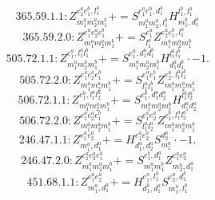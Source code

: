 \documentclass[letterpaper,10pt,fleqn,leqno,onecolumn]{article}
\begin{document}
\begin{equation} \;\;\;\;\;\;  365.59.1.1: Z^{e_{1}^{a}e_{1}^{b},l_{1}^{a}}_{m_{1}^{a}m_{2}^{a}m_{1}^{b}}+=S^{e_{1}^{a}e_{1}^{b},d_{1}^{a}}_{m_{1}^{a}m_{2}^{a},l_{1}^{b}}H^{l_{1}^{b},l_{1}^{a}}_{m_{1}^{b},d_{1}^{a}} \end{equation}
\begin{equation} \;\;\;\;\;\;  365.59.2.0: Z^{e_{1}^{a}e_{2}^{a}e_{1}^{b}}_{m_{1}^{a}m_{2}^{a}m_{1}^{b}}+=S^{e_{1}^{a}}_{l_{1}^{a}}Z^{e_{2}^{a}e_{1}^{b},l_{1}^{a}}_{m_{1}^{a}m_{2}^{a}m_{1}^{b}} \end{equation}
\begin{equation} \;\;\;\;\;\;  505.72.1.1: Z^{e_{1}^{a},l_{1}^{a}l_{1}^{b}}_{m_{1}^{a}m_{2}^{a}m_{1}^{b}}+=S^{e_{1}^{a},d_{1}^{a}d_{1}^{b}}_{m_{1}^{a}m_{2}^{a}m_{1}^{b}}H^{l_{1}^{a}l_{1}^{b}}_{d_{1}^{a}d_{1}^{b}}\cdot -1. \end{equation}
\begin{equation} \;\;\;\;\;\;  505.72.2.0: Z^{e_{1}^{a}e_{2}^{a}e_{1}^{b}}_{m_{1}^{a}m_{2}^{a}m_{1}^{b}}+=S^{e_{1}^{a}e_{1}^{b}}_{l_{1}^{a}l_{1}^{b}}Z^{e_{2}^{a},l_{1}^{a}l_{1}^{b}}_{m_{1}^{a}m_{2}^{a}m_{1}^{b}} \end{equation}
\begin{equation} \;\;\;\;\;\;  506.72.1.1: Z^{e_{1}^{b},l_{1}^{a}l_{2}^{a}}_{m_{1}^{a}m_{2}^{a}m_{1}^{b}}+=S^{e_{1}^{b},d_{1}^{a}d_{2}^{a}}_{m_{1}^{a}m_{2}^{a}m_{1}^{b}}H^{l_{1}^{a}l_{2}^{a}}_{d_{1}^{a}d_{2}^{a}} \end{equation}
\begin{equation} \;\;\;\;\;\;  506.72.2.0: Z^{e_{1}^{a}e_{2}^{a}e_{1}^{b}}_{m_{1}^{a}m_{2}^{a}m_{1}^{b}}+=S^{e_{1}^{a}e_{2}^{a}}_{l_{1}^{a}l_{2}^{a}}Z^{e_{1}^{b},l_{1}^{a}l_{2}^{a}}_{m_{1}^{a}m_{2}^{a}m_{1}^{b}} \end{equation}
\begin{equation} \;\;\;\;\;\;  246.47.1.1: Z^{e_{1}^{a}e_{2}^{a}}_{m_{1}^{a},d_{1}^{a}}+=H^{e_{1}^{a}e_{2}^{a}}_{d_{1}^{a},d_{2}^{a}}S^{d_{2}^{a}}_{m_{1}^{a}}\cdot -1. \end{equation}
\begin{equation} \;\;\;\;\;\;  246.47.2.0: Z^{e_{1}^{a}e_{2}^{a}e_{1}^{b}}_{m_{1}^{a}m_{2}^{a}m_{1}^{b}}+=S^{e_{1}^{b},d_{1}^{a}}_{m_{1}^{a}m_{1}^{b}}Z^{e_{1}^{a}e_{2}^{a}}_{m_{2}^{a},d_{1}^{a}} \end{equation}
\begin{equation} \;\;\;\;\;\;  451.68.1.1: Z^{e_{1}^{a}e_{2}^{a}}_{m_{1}^{a},d_{1}^{a}}+=H^{e_{1}^{a},l_{1}^{b}}_{d_{1}^{b},d_{1}^{a}}S^{e_{2}^{a},d_{1}^{b}}_{m_{1}^{a},l_{1}^{b}} \end{equation}
\end{document}
